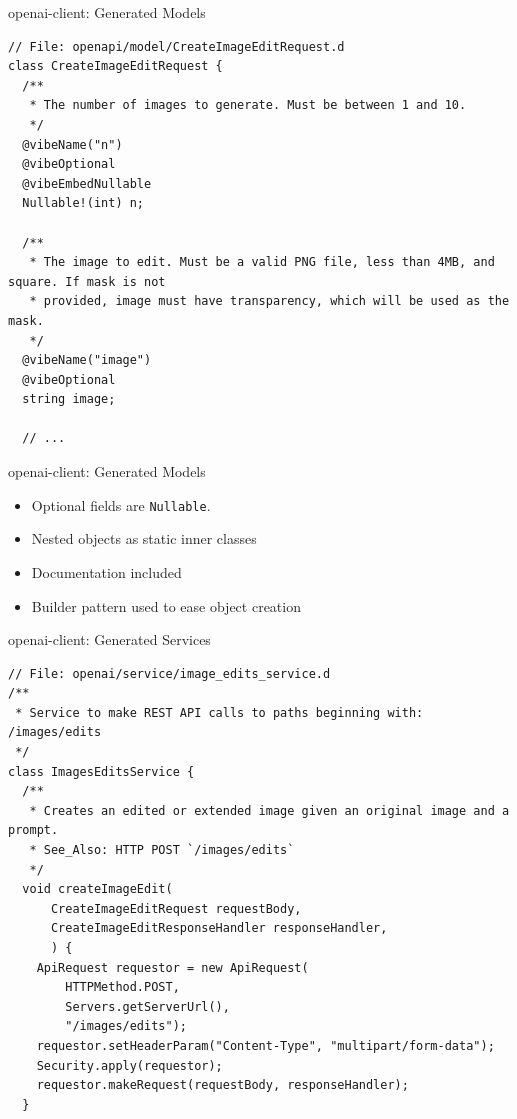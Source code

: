 \documentclass[bigger]{beamer}
\begin{document}
\begin{frame}[label={sec:orge2f41fb},fragile]{openai-client: Generated Models}
 \begin{verbatim}
// File: openapi/model/CreateImageEditRequest.d
class CreateImageEditRequest {
  /**
   * The number of images to generate. Must be between 1 and 10.
   */
  @vibeName("n")
  @vibeOptional
  @vibeEmbedNullable
  Nullable!(int) n;

  /**
   * The image to edit. Must be a valid PNG file, less than 4MB, and square. If mask is not
   * provided, image must have transparency, which will be used as the mask.
   */
  @vibeName("image")
  @vibeOptional
  string image;

  // ...
\end{verbatim}
\end{frame}

\begin{frame}[label={sec:org36c5527},fragile]{openai-client: Generated Models}
 \begin{itemize}
\item Optional fields are \texttt{Nullable}.
\item Nested objects as static inner classes
\item Documentation included
\item Builder pattern used to ease object creation
\end{itemize}
\end{frame}

\begin{frame}[label={sec:org1eddb2e},fragile]{openai-client: Generated Services}
 \begin{verbatim}
// File: openai/service/image_edits_service.d
/**
 * Service to make REST API calls to paths beginning with: /images/edits
 */
class ImagesEditsService {
  /**
   * Creates an edited or extended image given an original image and a prompt.
   * See_Also: HTTP POST `/images/edits`
   */
  void createImageEdit(
      CreateImageEditRequest requestBody,
      CreateImageEditResponseHandler responseHandler,
      ) {
    ApiRequest requestor = new ApiRequest(
        HTTPMethod.POST,
        Servers.getServerUrl(),
        "/images/edits");
    requestor.setHeaderParam("Content-Type", "multipart/form-data");
    Security.apply(requestor);
    requestor.makeRequest(requestBody, responseHandler);
  }
\end{verbatim}
\end{frame}
\end{document}
